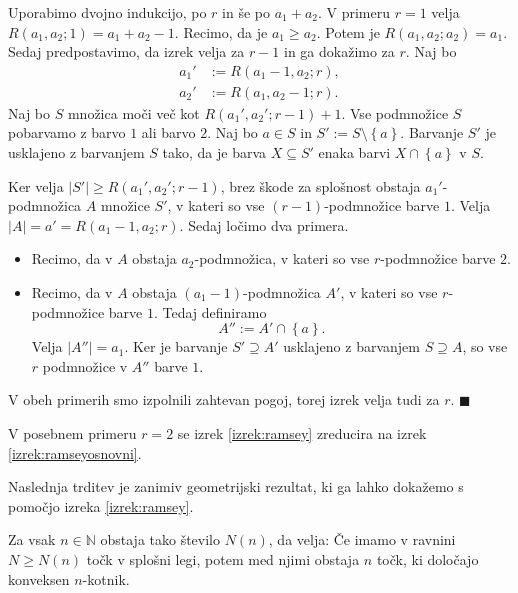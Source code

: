 \documentclass[twoside,11pt]{article}
\providecommand{\set}[1]{\left\{#1\right\}}
\providecommand{\abs}[1]{\left\lvert #1\right\rvert}
\begin{document}
\begin{dokaz}
    Uporabimo dvojno indukcijo, po $r$ in še po $a_1 + a_2$. 
    V primeru $r = 1$ velja $R(a_1, a_2; 1) = a_1 + a_2 -1$. Recimo, da je $a_1 \ge a_2$. Potem je 
    $R(a_1, a_2; a_2) = a_1$. Sedaj predpostavimo, da izrek velja za $r-1$ in ga dokažimo za $r$.
    Naj bo
    \begin{align*}
        a_1' &:= R(a_1 - 1, a_2; r), \\
        a_2' &:= R(a_1, a_2 -1; r).
    \end{align*}
    Naj bo $S$ množica moči več kot $R(a_1', a_2'; r-1) + 1$. Vse podmnožice $S$ pobarvamo z 
    barvo $1$ ali barvo $2$. Naj bo $a \in S$ in $S' := S \setminus \set{a}$. Barvanje $S'$ je 
    usklajeno z barvanjem $S$ tako, da je barva $X \subseteq S'$ enaka barvi $X \cap \set{a}$ v $S$.

    Ker velja $\abs{S'} \ge R(a_1', a_2';r-1)$, brez škode za splošnost obstaja $a_1'$-podmnožica $A$ 
    množice $S'$, v kateri so vse $(r-1)$-podmnožice barve $1$. Velja $\abs{A} = a' = R(a_1-1,a_2;r)$.
    Sedaj ločimo dva primera.
    \begin{itemize}
        \item Recimo, da v $A$ obstaja $a_2$-podmnožica, v kateri so vse $r$-podmnožice barve $2$.
        \item Recimo, da v $A$ obstaja $(a_1-1)$-podmnožica $A'$, v kateri so vse $r$-podmnožice barve $1$. 
        Tedaj definiramo
        \[
            A'' := A' \cap \set{a}.
        \]
        Velja $\abs{A''} = a_1$. Ker je barvanje $S' \supseteq A'$ usklajeno z barvanjem $S \supseteq A$, 
        so vse $r$ podmnožice v $A''$ barve $1$.
    \end{itemize}
    V obeh primerih smo izpolnili zahtevan pogoj, torej izrek velja tudi za $r$. \hfill $\blacksquare$
\end{dokaz}

V posebnem primeru $r = 2$ se izrek \ref{izrek:ramsey} zreducira 
na izrek \ref{izrek:ramseyosnovni}.

Naslednja trditev je zanimiv geometrijski rezultat, ki ga lahko dokažemo 
s pomočjo izreka \ref{izrek:ramsey}. 

\begin{izrek} \label{izrek:happyend}
    Za vsak $n \in \mathbb{N}$ obstaja tako število $N(n)$, da velja: Če imamo v ravnini $N \ge N(n)$
    točk v splošni legi, potem med njimi obstaja $n$ točk, ki določajo konveksen $n$-kotnik.
\end{izrek}
\end{document}
